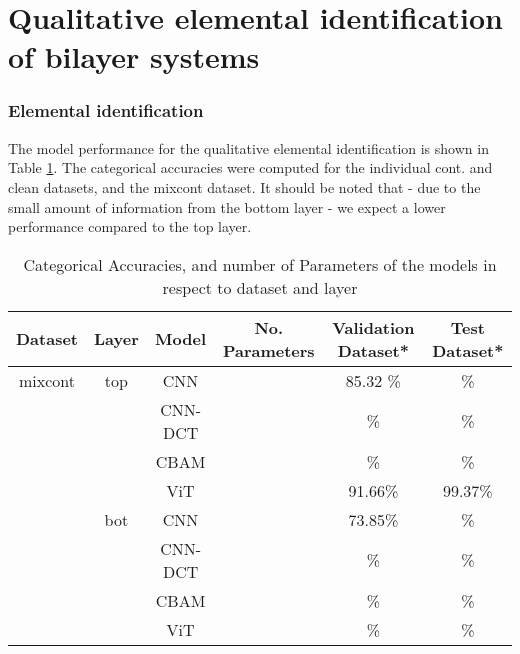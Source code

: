 \section{Qualitative elemental identification of bilayer systems}
\subsubsection{Elemental identification}
The model performance for the qualitative elemental identification is shown in Table \ref{tab:acc_qual}. The categorical accuracies were computed for the individual cont. and clean datasets, and the mixcont dataset. It should be noted that - due to the small amount of information from the bottom layer - we expect a lower performance compared to the top layer.

\begin{table}[H]
    \centering
    \begin{tabular}{c|c|c|c|c|c}
        Dataset & Layer & Model   & No. Parameters & Validation Dataset*  & Test Dataset*    \\
        \hline
        mixcont & top   & CNN     &                & 85.32 \%              &        \% \\
                &       & CNN-DCT &                &       \%              &         \% \\
                &       & CBAM    &                &       \%              &         \% \\
                &       & ViT     &                &  91.66\%              &   99.37\% \\
                & bot   & CNN     &                &  73.85\%              &          \%  \\
                &       & CNN-DCT &                &       \%              &          \%  \\
                &       & CBAM    &                &       \%              &         \% \\
                &       & ViT     &                &       \%              &           \% \\
    \end{tabular}
    \caption{Categorical Accuracies, and number of Parameters of the models in respect to dataset and layer}
    \label{tab:acc_qual}
\end{table}


